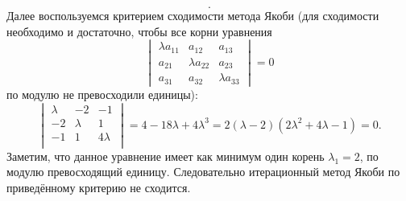 \documentclass[a4paper]{article}
\begin{document}
\begin{enumerate}
\[.\] 
Далее воспользуемся критерием сходимости метода Якоби
(для сходимости необходимо и достаточно, чтобы все корни уравнения
\[
	\begin{vmatrix}\lambda a_{11} & a_{12}& a_{13}\\
	a_{21} & \lambda a_{22} & a_{23} \\
a_{31} & a_{32} & \lambda a_{33}\end{vmatrix} =0
\]
по модулю не превосходили единицы):
\[
\begin{vmatrix} 
 \lambda  & -2 & -1 \\
 -2 & \lambda  & 1 \\
 -1 & 1 & 4 \lambda  \\
\end{vmatrix} =4-18\lambda +4\lambda^3=
2 (\lambda -2) \left(2 \lambda ^2+4 \lambda -1\right)=0
.\] 
Заметим, что данное уравнение имеет как минимум один корень $\lambda_1=2$, по модулю превосходящий единицу. Следовательно итерационный
метод Якоби по приведённому критерию не сходится.


\end{enumerate}
\end{document}
